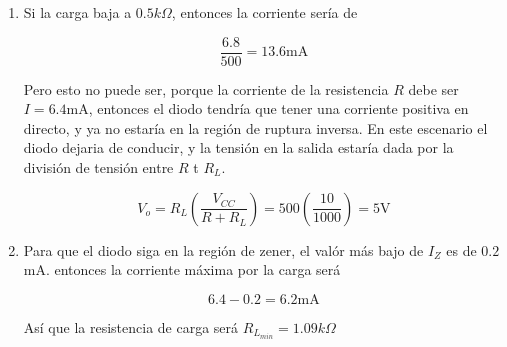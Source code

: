 \begin{enumerate}
    \item Si la carga baja a $0.5 k\Omega$, entonces la corriente sería de 
    
    \begin{equation*}
        \frac{6.8}{500} = 13.6\text{mA}
    \end{equation*}

    Pero esto no puede ser, porque la corriente de la resistencia $R$ debe ser $I=6.4$mA, entonces el diodo tendría que tener una corriente positiva en directo, y ya no estaría en la región de ruptura inversa. En este escenario el diodo dejaria de conducir, y la tensión en la salida estaría dada por la división de tensión entre $R$ t $R_L$.

    \begin{equation*}
        V_o = R_L \left( \frac{V_{CC}}{R+R_L} \right) = 500 \left( \frac{10}{1000} \right) = 5 \text{V}
    \end{equation*}

    \item Para que el diodo siga en la región de zener, el valór más bajo de $I_Z$ es de $0.2$mA. entonces la corriente máxima por la carga será 

    \begin{equation*}
        6.4-0.2 = 6.2\text{mA}
    \end{equation*}
 
    Así que la resistencia de carga será  $R_{L_{min}}=1.09 k\Omega$

    
    
\end{enumerate}